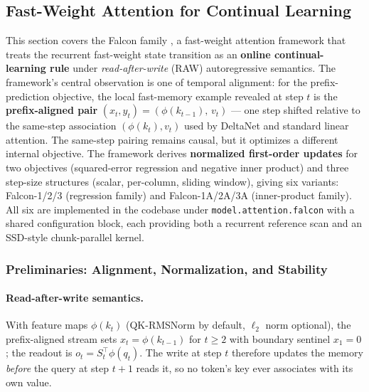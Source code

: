 \subsection{Fast-Weight Attention for Continual Learning}
\label{sec:annex-fast-weight}

This section covers the Falcon family \citep{zhang_falcon_2026}, a fast-weight attention framework that treats the recurrent fast-weight state transition as an \textbf{online continual-learning rule} under \emph{read-after-write} (RAW) autoregressive semantics. The framework's central observation is one of temporal alignment: for the prefix-prediction objective, the local fast-memory example revealed at step $t$ is the \textbf{prefix-aligned pair} $(x_t, y_t) = (\phi(k_{t-1}),\, v_t)$ --- one step shifted relative to the same-step association $(\phi(k_t), v_t)$ used by DeltaNet and standard linear attention. The same-step pairing remains causal, but it optimizes a different internal objective. The framework derives \textbf{normalized first-order updates} for two objectives (squared-error regression and negative inner product) and three step-size structures (scalar, per-column, sliding window), giving six variants: Falcon-1/2/3 (regression family) and Falcon-1A/2A/3A (inner-product family). All six are implemented in the codebase under \texttt{model.attention.falcon} with a shared configuration block, each providing both a recurrent reference scan and an SSD-style chunk-parallel kernel.

\subsubsection{Preliminaries: Alignment, Normalization, and Stability}

\paragraph{Read-after-write semantics.} With feature maps $\phi(k_t)$ (QK-RMSNorm by default, $\ell_2$ norm optional), the prefix-aligned stream sets $x_t = \phi(k_{t-1})$ for $t \ge 2$ with boundary sentinel $x_1 = 0$; the readout is $o_t = S_t^\top \phi(q_t)$. The write at step $t$ therefore updates the memory \emph{before} the query at step $t+1$ reads it, so no token's key ever associates with its own value.

